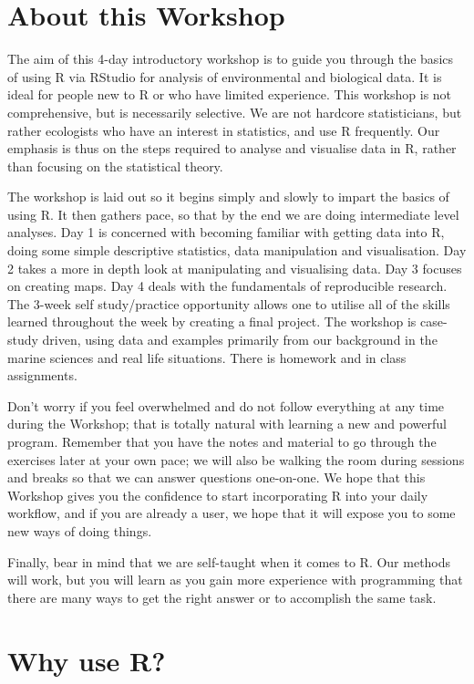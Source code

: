 \documentclass[
]{book}
\begin{document}
\hypertarget{about-this-workshop}{%
\section{About this Workshop}\label{about-this-workshop}}

The aim of this 4-day introductory workshop is to guide you through the basics of using R via RStudio for analysis of environmental and biological data. It is ideal for people new to R or who have limited experience. This workshop is not comprehensive, but is necessarily selective. We are not hardcore statisticians, but rather ecologists who have an interest in statistics, and use R frequently. Our emphasis is thus on the steps required to analyse and visualise data in R, rather than focusing on the statistical theory.

The workshop is laid out so it begins simply and slowly to impart the basics of using R. It then gathers pace, so that by the end we are doing intermediate level analyses. Day 1 is concerned with becoming familiar with getting data into R, doing some simple descriptive statistics, data manipulation and visualisation. Day 2 takes a more in depth look at manipulating and visualising data. Day 3 focuses on creating maps. Day 4 deals with the fundamentals of reproducible research. The 3-week self study/practice opportunity allows one to utilise all of the skills learned throughout the week by creating a final project. The workshop is case-study driven, using data and examples primarily from our background in the marine sciences and real life situations. There is homework and in class assignments.

Don't worry if you feel overwhelmed and do not follow everything at any time during the Workshop; that is totally natural with learning a new and powerful program. Remember that you have the notes and material to go through the exercises later at your own pace; we will also be walking the room during sessions and breaks so that we can answer questions one-on-one. We hope that this Workshop gives you the confidence to start incorporating R into your daily workflow, and if you are already a user, we hope that it will expose you to some new ways of doing things.

Finally, bear in mind that we are self-taught when it comes to R. Our methods will work, but you will learn as you gain more experience with programming that there are many ways to get the right answer or to accomplish the same task.

\hypertarget{why-use-r}{%
\section{Why use R?}\label{why-use-r}}
\end{document}
